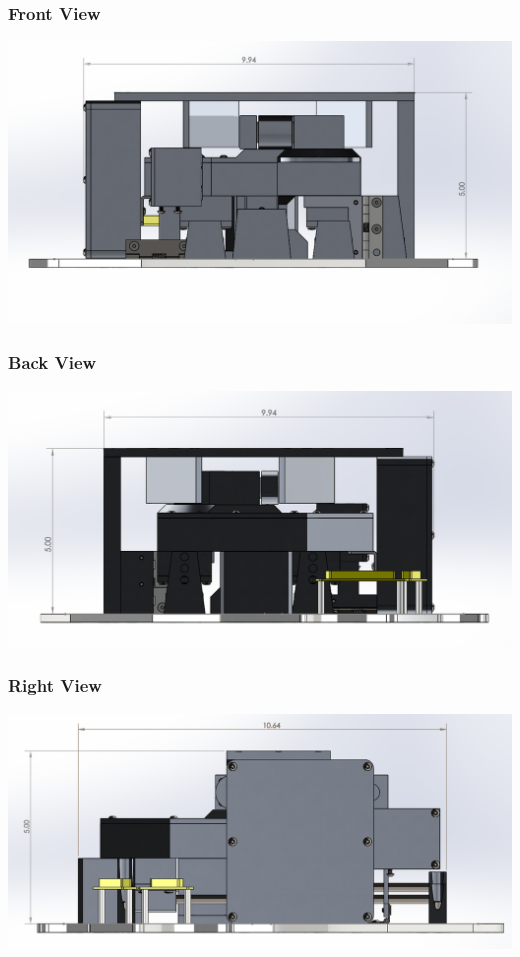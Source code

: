 \subsubsection{Front View}
\includegraphics[width=\textwidth]{./images/CAD/FRONT}
\subsubsection{Back View}
\includegraphics[width=\textwidth]{./images/CAD/BACK}
\subsubsection{Right View}
\includegraphics[width=\textwidth]{./images/CAD/RIGHT}
